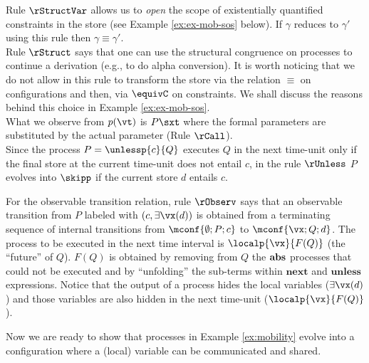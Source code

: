 \documentclass{tlp}
\begin{document}
\noindent{-} Rule $\rStructVar$ allows us to \emph{open} the scope of  existentially quantified constraints in the store  (see Example \ref{ex:ex-mob-sos} below). If $\gamma$ reduces to $\gamma'$ using this rule then $\gamma\equiv \gamma'$. 
\\\noindent{-} Rule $\rStruct$ says that one can use the structural congruence on processes to continue a derivation (e.g., to do alpha conversion). It is worth noticing that we do not allow in this rule to transform the store via the relation $\equiv$ on configurations and then, via $\equivC$ on constraints. We shall discuss the reasons  behind  this choice  in  Example \ref{ex:ex-mob-sos}. 
\\\noindent{-}What we observe from $p(\vt)$ is $P\sxt$ where the formal 
parameters are substituted by the actual parameter (Rule $\rCall$). 
\\\noindent{-} Since the process $P=\unlessp{c}{Q}$ executes $Q$ in the next time-unit only if  the final store at the current time-unit  does not entail $c$, in the rule $\rUnless$ $P$ evolves into $\skipp$ if the current store $d$ entails $c$. 

For the observable transition relation, rule $\rObserv$ says that an observable transition from \( P \) labeled
with  $(c,\exists \vx(d))$ is obtained from a terminating sequence of internal transitions from $\mconf{\emptyset; P;c}$ to  $\mconf{\vx;Q;d}$. The process  to be executed in the next time interval is   \(\localp{\vx}{F(Q)}\) (the ``future'' of $Q$). $F(Q)$  is obtained by removing from \(Q\) the ${\bf abs}$ processes that could not be executed  and  by 
``unfolding'' the sub-terms within $\mathbf{next}$ and $\mathbf{unless}$ expressions. Notice that 
the output of a process hides the local variables ($\exists \vx (d)$) and those variables are also hidden in the next time-unit ($\localp{\vx}{F(Q)}$). 


Now we are ready to show 
 that processes in Example \ref{ex:mobility} evolve into a configuration where a (local) variable can be communicated and shared. 
\end{document}
